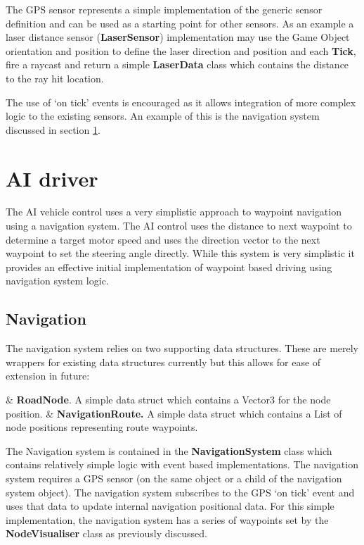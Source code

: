 \documentclass{article}
\begin{document}
The GPS sensor represents a simple implementation of the generic sensor definition and can be used as a starting point for other sensors. As an example a laser distance sensor (\textbf{LaserSensor}) implementation may use the Game Object orientation and position to define the laser direction and position and each \textbf{Tick}, fire a raycast and return a simple \textbf{LaserData} class which contains the distance to the ray hit location.

The use of `on tick' events is encouraged as it allows integration of more complex logic to the existing sensors. An example of this is the navigation system discussed in section \ref{s:AI}.

\section{AI driver}\label{s:AI}

The AI vehicle control uses a very simplistic approach to waypoint navigation using a navigation system. The AI control uses the distance to next waypoint to determine a target motor speed and uses the direction vector to the next waypoint to set the steering angle directly. While this system is very simplistic it provides an effective initial implementation of waypoint based driving using navigation system logic.

\subsection{Navigation}

The navigation system relies on two supporting data structures. These are merely wrappers for existing data structures currently but this allows for ease of extension in future: 
\begin{easylist}
	& \textbf{RoadNode}. A simple data struct which contains a Vector3 for the node position.
	& \textbf{NavigationRoute.}  A simple data struct which contains a List of node positions representing route waypoints.
\end{easylist}

The Navigation system is contained in the \textbf{NavigationSystem} class which contains relatively simple logic with event based implementations. The navigation system requires a GPS sensor (on the same object or a child of the navigation system object). The navigation system subscribes to the GPS `on tick' event and uses that data to update internal navigation positional data. For this simple implementation, the navigation system has a series of waypoints set by the \textbf{NodeVisualiser} class as previously discussed.
\end{document}
